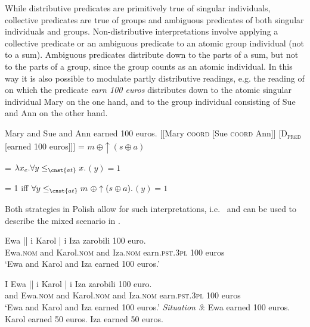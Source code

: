 \documentclass[output=paper]{langscibook}
\begin{document}
\noindent While distributive predicates are primitively true of singular individuals, collective predicates are true of groups and ambiguous predicates of both singular individuals and groups. Non-distributive  interpretations involve applying a collective predicate or an ambiguous predicate to an atomic group individual (not to a sum). Ambiguous predicates distribute down to the parts of a sum, but not to the parts of a group, since the group counts as an atomic individual. In this way it is also possible to modulate partly distributive readings, e.g. the reading of  on which the predicate \textit{earn 100 euros} distributes down to the atomic singular individual Mary on the one hand, and to the group individual consisting of Sue and Ann on the other hand. 

\ea
\ea\label{ros:inter} Mary and Sue and Ann earned 100 euros.
\ex\label{ros:land-d} [[Mary \textsc{coord} [Sue \textsc{coord} Ann]] [\textsc{D\textsubscript{pred}} [earned 100 euros]]] 
\ex \sib{Mary \textsc{coord} $\uparrow$ [Sue \textsc{coord} Ann]]} = $m\ \oplus \uparrow(s \oplus a)$

\ex {} = $\lambda x_{e}. \forall y \le_{\cnst{at}} x.$$(y) = 1$

\ex {} = 1 iff $\forall y \le_{\cnst{at}} m\ \oplus \uparrow(s \oplus a).$$(y) = 1$
\z\z

\noindent Both strategies in Polish allow for such interpretations, i.e.~ and  can be used to describe the mixed scenario in .

\ea
\ea\label{ros:un-part} \gll Ewa || i Karol | i Iza zarobili 100 euro. \\
Ewa.\textsc{nom} {} and Karol.\textsc{nom} {} and Iza.\textsc{nom} earn.\textsc{pst.3pl} 100 euros \\
\glt `Ewa and Karol and Iza earned 100 euros.' 

\ex\label{ros:mark-part} \gll I Ewa || i Karol | i Iza zarobili 100 euro. \\
and Ewa.\textsc{nom} {} and Karol.\textsc{nom} {} and Iza.\textsc{nom} earn.\textsc{pst.3pl} 100 euros \\
\glt `Ewa and Karol and Iza earned 100 euros.' 
\z\ex\label{ros:sc3}
\textit{Situation 3}: Ewa earned 100 euros. Karol earned 50 euros. Iza earned 50 euros.
\z
\end{document}
